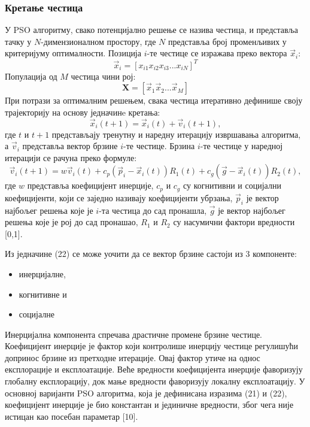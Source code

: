 \documentclass[12pt]{article}
\begin{document}
\subsubsection{Кретање честица}
У PSO алгоритму, свако потенцијално решење се назива честица, и представља тачку у $N$-димензионалном простору, где $N$ представља број променљивих у критеријуму оптималности. Позиција $i$-те честице се изражава преко вектора $\vec x_i$:
\begin{equation}
    \vec x_i = [x_{i1} x_{i2} x_{i3}... x_{iN}]^T
\end{equation}
Популација од $M$ честица чини рој:
\begin{equation}
    \textbf{X} = [\vec x_1 \vec x_2 ... \vec x_M]
\end{equation}
При потрази за оптималним решењем, свака честица итеративно дефинише своју трајекторију на основу једначинe кретања:
\begin{equation}
    \vec x_i(t+1) = \vec x_i(t) +\vec v_i(t+1),
\end{equation}
где $t$ и $t+1$ представљају тренутну и наредну итерацију извршавања алгоритма, а $\vec v_i$ представља вектор брзине $i$-те честице. Брзина $i$-те честице у наредној итерацији се рачуна преко формуле:
\begin{equation}
    \vec v_i(t+1) = w\vec v_i(t) + c_p(\vec p_i- \vec x_i(t))R_1(t) + c_g(\vec g- \vec x_i(t))R_2(t),
\end{equation}
где $w$ представља коефицијент инерције, $c_p$ и $c_g$ су когнитивни и социјални коефицијенти, који се заједно називају коефицијенти убрзања, $\vec p_i$ је вектор најбољег решења које је $i$-та честица до сад пронашла, $\vec{g}$ је вектор најбољег решења које је рој до сад пронашао,  $R_1$ и $R_2$ су насумични фактори вредности [0,1].

Из једначине (22) се може уочити да се вектор брзине састоји из 3 компоненте:
\begin{itemize}
    \item инерцијалне,
    \item когнитивне и
    \item социјалне
\end{itemize}
Инерцијална компонента спречава драстичне промене брзине честице. Коефицијент инерције је фактор који контролише инерцију честице регулишући допринос брзине из претходне итерације. Овај фактор утиче на однос експлорације и експлоатације. Веће вредности коефицијента инерције фаворизују глобалну експлорацију, док мање вредности фаворизују локалну експлоатацију. У основној варијанти PSO алгоритма, која је дефинисана изразима (21) и (22), коефицијент инерције је био константан и јединичне вредности, због чега није истицан као посебан параметар [10].
\end{document}
